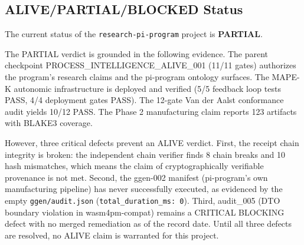 \subsection{ALIVE/PARTIAL/BLOCKED Status}
\label{sec:research-pi-program-evidence-status}

The current status of the \texttt{research-pi-program} project is \textbf{PARTIAL}.

The PARTIAL verdict is grounded in the following evidence. The parent checkpoint PROCESS\_INTELLIGENCE\_ALIVE\_001 (11/11 gates) authorizes the program's research claims and the pi-program ontology surfaces. The MAPE-K autonomic infrastructure is deployed and verified (5/5 feedback loop tests PASS, 4/4 deployment gates PASS). The 12-gate Van der Aalst conformance audit yields 10/12 PASS. The Phase 2 manufacturing claim reports 123 artifacts with BLAKE3 coverage.

However, three critical defects prevent an ALIVE verdict. First, the receipt chain integrity is broken: the independent chain verifier finds 8 chain breaks and 10 hash mismatches, which means the claim of cryptographically verifiable provenance is not met. Second, the ggen-002 manifest (pi-program's own manufacturing pipeline) has never successfully executed, as evidenced by the empty \texttt{ggen/audit.json} (\texttt{total\_duration\_ms: 0}). Third, audit\_005 (DTO boundary violation in wasm4pm-compat) remains a CRITICAL BLOCKING defect with no merged remediation as of the record date. Until all three defects are resolved, no ALIVE claim is warranted for this project.
